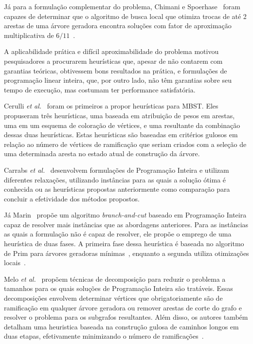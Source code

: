 \documentclass[conference]{IEEEtran}
\begin{document}
Já para a formulação complementar do problema, Chimani e Spoerhase~\cite{chimani2015} foram capazes de determinar que o algoritmo de busca local que otimiza trocas de até 2 arestas de uma árvore geradora encontra soluções com fator de aproximação multiplicativa de $6/11$~\cite{chimani2015}.

A aplicabilidade prática e difícil aproximabilidade do problema motivou pesquisadores a procurarem heurísticas que, apesar de não contarem com garantias teóricas, obtivessem bons resultados na prática, e formulações de programação linear inteira, que, por outro lado, não têm garantias sobre seu tempo de execução, mas costumam ter performance satisfatória.

Cerulli \textit{et al.}~\cite{cerulli2009} foram os primeiros a propor heurísticas para MBST.
Eles propuseram três heurísticas, uma baseada em atribuição de pesos em arestas, uma em um esquema de coloração de vértices, e uma resultante da combinação dessas duas heurísticas.
Estas heurísticas são baseadas em critérios gulosos em relação ao número de vértices de ramificação que seriam criados com a seleção de uma determinada aresta no estado atual de construção da árvore.

Carrabs \textit{et al.}~\cite{carrabs2013} desenvolvem formulações de Programação Inteira e utilizam diferentes relaxações, utilizando instâncias para as quais a solução ótima é conhecida ou as heurísticas propostas anteriormente como comparação para concluir a efetividade dos métodos propostos.

Já Marin~\cite{marin2015} propõe um algoritmo \textit{branch-and-cut} baseado em Programação Inteira capaz de resolver mais instâncias que as abordagens anteriores.
Para as instâncias as quais a formulação não é capaz de resolver, ele propõe o emprego de uma heurística de duas fases.
A primeira fase dessa heurística é baseada no algoritmo de Prim para árvores geradoras mínimas~\cite{prim1957}, enquanto a segunda utiliza otimizações locais~\cite{marin2015}.

Melo \textit{et al.}~\cite{melo2016} propõem técnicas de decomposição para reduzir o problema a tamanhos para os quais soluções de Programação Inteira são tratáveis.
Essas decomposições envolvem determinar vértices que obrigatoriamente são de ramificação em qualquer árvore geradora ou remover arestas de corte do grafo e resolver o problema para os subgrafos resultantes.
Além disso, os autores também detalham uma heuristica baseada na construção gulosa de caminhos longos em duas etapas, efetivamente minimizando o número de ramificações~\cite{melo2016}.
\end{document}

